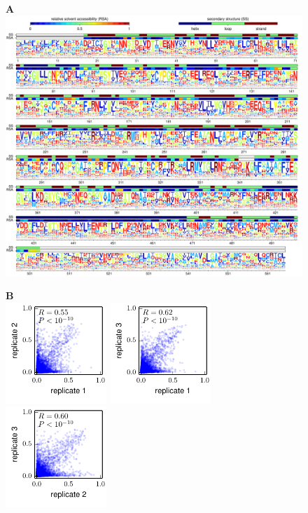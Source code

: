 \documentclass[12pt,letterpaper]{article}
\begin{document}
\begin{figure}

{\bf \Large A} \\
\includegraphics[clip, trim=0 0 0 0.04in,valign=t,width=6.3in]{../../../examples/ThyagarajanBloom2014_WSN_HA/prefs_logoplot.pdf}
\vspace{0.07in}

{\bf \Large B} \\
\vspace{-0.2in}
\includegraphics[valign=t,width=1.5in]{../../../examples/ThyagarajanBloom2014_WSN_HA/correlations/corr_1_vs_2.pdf}\hspace{0.2in}
\includegraphics[valign=t,width=1.5in]{../../../examples/ThyagarajanBloom2014_WSN_HA/correlations/corr_1_vs_3.pdf}\hspace{0.2in}
\includegraphics[valign=t,width=1.5in]{../../../examples/ThyagarajanBloom2014_WSN_HA/correlations/corr_2_vs_3.pdf}

\end{figure}
\end{document}
